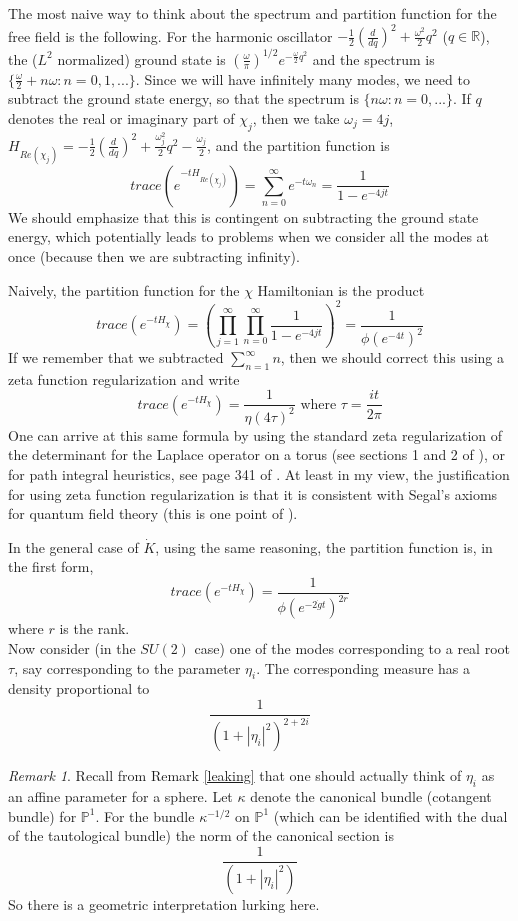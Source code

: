 \documentclass{amsart}
\theoremstyle{conjecture}
\theoremstyle{definition}
\theoremstyle{question}
\theoremstyle{questions}
\theoremstyle{remark}
\newtheorem*{remark}{Remark}
\theoremstyle{remarks}
\theoremstyle{example}
\numberwithin{equation}{section}
\begin{document}
The most naive way to think about the spectrum and partition function for the free field is the following. For the harmonic oscillator $-\frac 12 (\frac{d}{dq})^2+\frac{\omega^2}{2} q^2$ ($q\in \mathbb R$), the ($L^2$ normalized) ground state is $(\frac{\omega}{\pi})^{1/2}e^{-\frac{\omega}{2}q^2}$ and the spectrum is $\{\frac{\omega}{2}+n\omega:n=0,1,...\}$. Since we will have infinitely many modes, we need to subtract the ground state energy, so that the spectrum is $\{n\omega:n=0,...\}$. If $q$ denotes the real or imaginary part of $\chi_j$, then we take $\omega_j=4j$, $H_{Re(\chi_j)}=-\frac 12 (\frac{d}{dq})^2+\frac{\omega_j^2}{2} q^2-\frac{\omega_j}{2}$, and the partition function is
$$trace(e^{-tH_{Re(\chi_j)}})=\sum_{n=0}^{\infty}e^{-t\omega_n}=\frac{1}{1-e^{-4jt}} $$
We should emphasize that this is contingent on subtracting the ground state energy, which potentially leads to problems when we consider all the modes at once (because then we are subtracting infinity).

Naively, the partition function for the $\chi$ Hamiltonian is the product
$$trace(e^{-tH_{\chi}})=(\prod_{j=1}^{\infty}\prod_{n=0}^{\infty}\frac{1}{1-e^{-4jt}})^2=\frac{1}{\phi(e^{-4t})^2}$$
If we remember that we subtracted $\sum_{n=1}^{\infty}n$, then we should correct this using a zeta function regularization and write
$$trace(e^{-tH_{\chi}})=\frac{1}{\eta(4\tau)^2} \text{ where } \tau=\frac{it}{2\pi}$$
One can arrive at this same formula by using the standard zeta regularization of the determinant for the Laplace operator on a torus (see sections 1 and 2 of \cite{Gawedzki2}), or for path integral heuristics, see page 341 of \cite{DMS}. At least in my view, the justification for using
zeta function regularization is that it is consistent with Segal's axioms for quantum field theory (this is one point of \cite{Pi2.5}).

In the general case of $\dot K$, using the same reasoning, the partition function is, in the first form,
$$trace(e^{-tH_{\chi}})=\frac{1}{\phi(e^{-2\dot g t})^{2r}}$$
where $r$ is the rank.\\

Now consider (in the $SU(2)$ case) one of the modes corresponding to a real root $\tau$, say corresponding to the parameter $\eta_i$. The corresponding measure has a density proportional to
$$\frac{1}{(1+|\eta_i|^2)^{2+2i}}$$

\begin{remark} \label{geomremark1} Recall from Remark \ref{leaking} that one should actually think of $\eta_i$ as an affine parameter for a sphere. Let $\kappa$ denote the canonical bundle (cotangent bundle) for $\mathbb P^1$. For the bundle $\kappa^{-1/2}$ on $\mathbb P^1$ (which can be identified with the dual of the tautological bundle) the norm of the canonical section is
$$\frac{1}{(1+|\eta_i|^2)}$$
So there is a geometric interpretation lurking here.
\end{remark}
\end{document}
